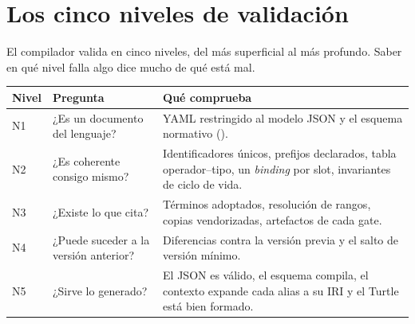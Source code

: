 \chapter{Los cinco niveles de validación}
\label{ch:validacion}

El compilador valida en cinco niveles, del más superficial al más profundo. Saber en qué nivel falla algo dice
mucho de qué está mal.

\begin{center}
\end{center}

\noindent\begin{tabularx}{\linewidth}{@{}C{1cm}L{3.2cm}Y@{}}
\toprule
\textbf{Nivel} & \textbf{Pregunta} & \textbf{Qué comprueba} \\
\midrule
N1 & ¿Es un documento del lenguaje? & YAML restringido al modelo JSON y el esquema normativo (). \\
N2 & ¿Es coherente consigo mismo? & Identificadores únicos, prefijos declarados, tabla operador–tipo, un \emph{binding} por slot, invariantes de ciclo de vida. \\
N3 & ¿Existe lo que cita? & Términos adoptados, resolución de rangos, copias vendorizadas, artefactos de cada gate. \\
N4 & ¿Puede suceder a la versión anterior? & Diferencias contra la versión previa y el salto de versión mínimo. \\
N5 & ¿Sirve lo generado? & El JSON es válido, el esquema compila, el contexto expande cada alias a su IRI y el Turtle está bien formado. \\
\bottomrule
\end{tabularx}

